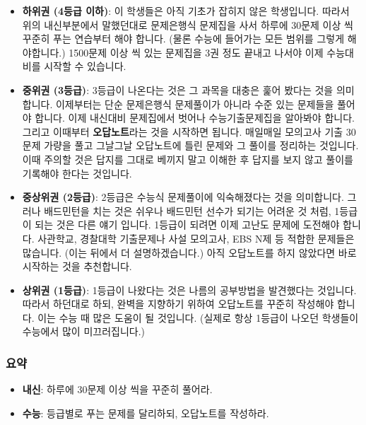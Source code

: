 \documentclass[final]{IEEEphot}
\begin{document}
\begin{itemize}
 \item \textbf{하위권 (4등급 이하)}: 이 학생들은 아직 기초가 잡히지 않은 학생입니다. 따라서 위의 내신부분에서 말했던대로 문제은행식 문제집을 사서 하루에 30문제 이상 씩 꾸준히 푸는 연습부터
 해야 합니다. (물론 수능에 들어가는 모든 범위를 그렇게 해야합니다.) 1500문제 이상 씩 있는 문제집을 3권 정도 끝내고 나서야 이제 수능대비를 시작할 수 있습니다. \vspace{0.1cm}
 \item \textbf{중위권 (3등급)}: 3등급이 나온다는 것은 그 과목을 대충은 훑어 봤다는 것을 의미합니다. 이제부터는 단순 문제은행식 문제풀이가 아니라 수준 있는 문제들을 풀어야 합니다.
 이제 내신대비 문제집에서 벗어나 수능기출문제집을 알아봐야 합니다. 그리고 이때부터 \textbf{오답노트}라는 것을 시작하면 됩니다. 매일매일 모의고사 기출 30문제 가량을 풀고
 그날그날 오답노트에 틀린 문제와 그 풀이를 정리하는 것입니다. 이때 주의할 것은 답지를 그대로 베끼지 말고 이해한 후 답지를 보지 않고 풀이를 기록해야 한다는 것입니다. \vspace{0.1cm}
 \item \textbf{중상위권 (2등급)}: 2등급은 수능식 문제풀이에 익숙해졌다는 것을 의미합니다. 그러나 배드민턴을 치는 것은 쉬우나 배드민턴 선수가 되기는 어려운 것 처럼, 1등급이 되는 것은 다른 얘기 입니다.
 1등급이 되려면 이제 고난도 문제에 도전해야 합니다. 사관학교, 경찰대학 기출문제나 사설 모의고사, EBS N제 등 적합한 문제들은 많습니다. (이는 뒤에서 더 설명하겠습니다.) 
 아직 오답노트를 하지 않았다면 바로 시작하는 것을 추천합니다. \vspace{0.1cm}
 \item \textbf{상위권 (1등급)}: 1등급이 나왔다는 것은 나름의 공부방법을 발견했다는 것입니다. 따라서 하던대로 하되, 완벽을 지향하기 위하여 오답노트를 꾸준히 작성해야 합니다. 이는 수능 때 많은 도움이 될 것입니다.
 (실제로 항상 1등급이 나오던 학생들이 수능에서 많이 미끄러집니다.)
\end{itemize}

\subsubsection{요약}

\vspace{0.1cm}

\begin{itemize}
 \item \textbf{내신}: 하루에 30문제 이상 씩을 꾸준히 풀어라.\vspace{0.1cm}
 \item \textbf{수능}: 등급별로 푸는 문제를 달리하되, 오답노트를 작성하라.
\end{itemize}
\end{document}
